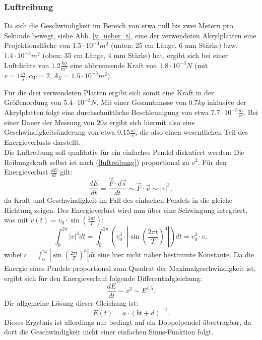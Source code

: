 \subsubsection{Luftreibung}
Da sich die Geschwindigkeit im Bereich von etwa null bis zwei Metern pro Sekunde bewegt, siehe Abb. \ref{v_ueber_t}, eine der verwendeten Akrylplatten eine Projektionsfläche von $ 1.5 \cdot 10^{-3} m^2$ (unten: 25 cm Länge, 6 mm Stärke) bzw. $ 1.4 \cdot 10^{-3} m^2$ (oben: 35 cm Länge, 4 mm Stärke) hat, ergibt sich bei einer Luftdichte von $ 1.2 \frac{kg}{m^2} $ eine abbremsende Kraft von $ 1.8 \cdot 10^{-3} N $ (mit $ v = 1 \frac{m}{s}, c_W = 2, A_S = 1.5 \cdot 10^{-3} m^2 $). 

Für die drei verwendeten Platten ergibt sich somit eine Kraft in der Größenordung von $ 5.4 \cdot 10^{-3}  N $. Mit einer Gesamtmasse von $0.7 kg$ inklusive der Akrylplatten folgt eine durchschnittliche Beschleunigung von etwa $ 7.7 \cdot 10^{-3} \frac{m}{s^2} $. Bei einer Dauer der Messung von $20 s$ ergibt sich hiermit also  eine Geschwindigkeitsänderung von etwa $ 0.15 \frac{m}{s} $, die also einen wesentlichen Teil des Energieverlusts darstellt. \\
Die Luftreibung soll qualitativ für ein einfaches Pendel diskutiert werden: Die Reibungskraft selbst ist nach (\ref{luftreibung}) proportional zu $v^2$. Für den Energieverlust $\frac{dE}{dt}$ gilt:
\begin{equation}
\frac{d E}{d t} = \frac{\vec{F} \cdot d\vec{s}}{dt} \sim  \vec{F} \cdot \vec{v} \sim |v|^3, 
\end{equation}
da Kraft und Geschwindigkeit im Fall des einfachen Pendels in die gleiche Richtung zeigen. 
Der Energieverlust wird nun über eine Schwingung integriert, was mit $ v(t) = v_0 \cdot \sin(\frac{2 \pi t}{T})$:
\begin{equation}
\int _0^{2\pi} |v|^3 dt = \int _0^{2\pi}( v_0^3 \cdot |\sin(\frac{2 \pi t}{T})^3|)dt = v_0^3 \cdot c,
\end{equation}
wobei $ c = \int _0^{2\pi} |\sin(\frac{2 \pi t}{T})^3|dt $ eine hier nicht näher bestimmte Konstante. 
Da die Energie eines Pendels proportional zum Quadrat der Maximalgeschwindigkeit ist, ergibt sich für den Energieverlauf folgende Differentialgleichung: 
\begin{equation}
\frac{dE}{dt} \sim v^3 \sim E^{1.5}. 
\end{equation}
Die allgemeine Lösung dieser Gleichung ist: 
\begin{equation}
E(t) = a \cdot (bt + d)^{-2}. 
\end{equation}
Dieses Ergebnis ist allerdings nur bedingt auf ein Doppelpendel übertragbar, da dort die Geschwindigkeit nicht einer einfachen Sinus-Funktion folgt. 

